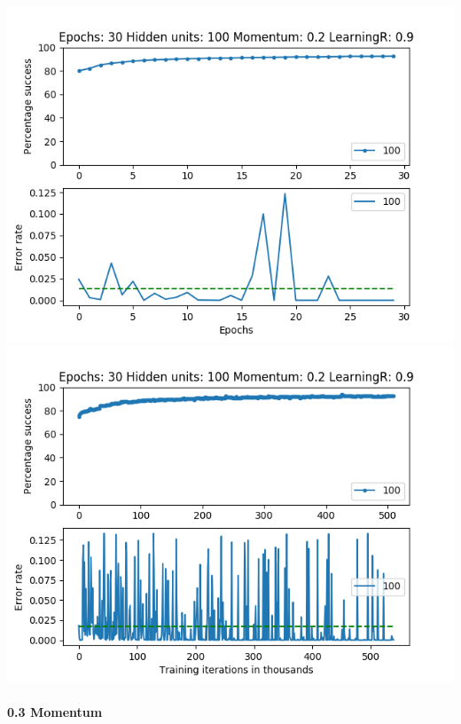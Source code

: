 \documentclass[11pt]{article}
\makeatletter
\def\maxwidth{\ifdim\Gin@nat@width>\linewidth\linewidth
    \else\Gin@nat@width\fi}
\let\Oldincludegraphics\includegraphics
\renewcommand{\includegraphics}[1]{\Oldincludegraphics[width=.8\maxwidth]{#1}}
\makeatother
\begin{document}
\includegraphics{Experiment2/E2_NN_Epoch_Momentum_0.2_30Epochs_100Hiddenunits.png}
\includegraphics{Experiment2/E2_NN_Training_Momentum_0.2_30Epochs_100Hiddenunits.png}

\hypertarget{momentum-3}{%
\paragraph{0.3 Momentum}\label{momentum-3}}
\end{document}
